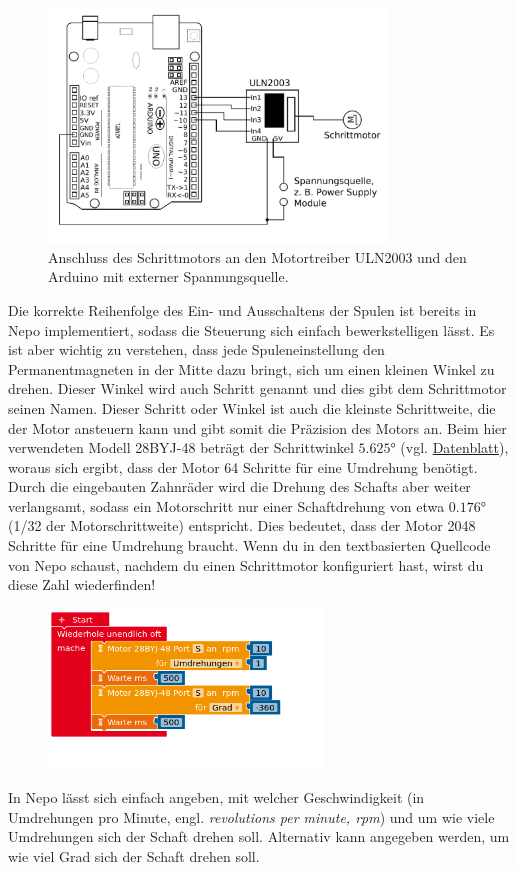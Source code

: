 \begin{figure}[h]
	\centering
	\includegraphics[width=0.8\textwidth]{./Zeichnungen/schaltplan-schrittmotor-anschluss.png}
	\caption{Anschluss des Schrittmotors an den Motortreiber ULN2003 und den Arduino mit externer Spannungsquelle.}
\end{figure}
Die korrekte Reihenfolge des Ein- und Ausschaltens der Spulen ist bereits in Nepo implementiert, sodass die Steuerung sich einfach bewerkstelligen lässt. Es ist aber wichtig zu verstehen, dass jede Spuleneinstellung den Permanentmagneten in der Mitte dazu bringt, sich um einen kleinen Winkel zu drehen. Dieser Winkel wird auch Schritt genannt und dies gibt dem Schrittmotor seinen Namen. Dieser Schritt oder Winkel ist auch die kleinste Schrittweite, die der Motor ansteuern kann und gibt somit die Präzision des Motors an. Beim hier verwendeten Modell 28BYJ-48 beträgt der Schrittwinkel $\ang{5,625}$ (vgl. \href{https://components101.com/motors/28byj-48-stepper-motor}{Datenblatt}), woraus sich ergibt, dass der Motor 64 Schritte für eine Umdrehung benötigt. Durch die eingebauten Zahnräder wird die Drehung des Schafts aber weiter verlangsamt, sodass ein Motorschritt nur einer Schaftdrehung von etwa $\ang{0,176}$ (1/32 der Motorschrittweite) entspricht. Dies bedeutet, dass der Motor 2048 Schritte für eine Umdrehung braucht. Wenn du in den textbasierten Quellcode von Nepo schaust, nachdem du einen Schrittmotor konfiguriert hast, wirst du diese Zahl wiederfinden!
\begin{figure}[h]
	\centering
	\includegraphics[width=0.65\textwidth]{./pics/schrittmotor-steuerung.png}
	\vspace{-\baselineskip}
\end{figure}
In Nepo lässt sich einfach angeben, mit welcher Geschwindigkeit (in Umdrehungen pro Minute, engl. \emph{revolutions per minute, rpm}) und um wie viele Umdrehungen sich der Schaft drehen soll. Alternativ kann angegeben werden, um wie viel Grad sich der Schaft drehen soll.

